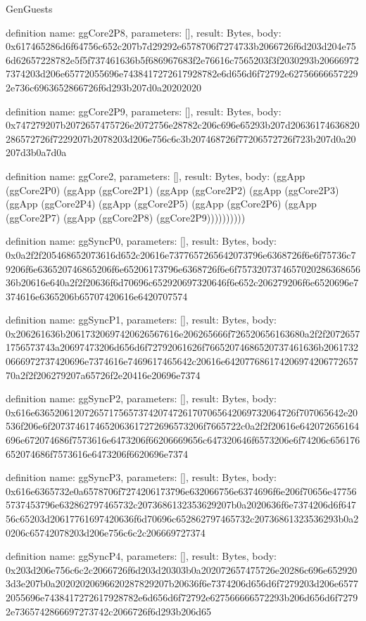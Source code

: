 \begin{lexlean}{GenGuests}
\begin{semanticmodule}
definition{
  name: ggCore2P8,
  parameters: [],
  result: Bytes,
  body: 0x617465286d6f64756c652c207b7d29292e6578706f7274733b2066726f6d203d204e756d62657228782e5f5f737461636b5f686967683f2e76616c7565203f3f2030293b206669727374203d206e65772055696e7438417272617928782e6d656d6f72792e627566666572292e736c6963652866726f6d293b207d0a20202020
}

definition{
  name: ggCore2P9,
  parameters: [],
  result: Bytes,
  body: 0x747279207b2072657475726e2072756e28782c206c696e65293b207d20636174636820286572726f7229207b2078203d206e756c6c3b207468726f77206572726f723b207d0a20207d3b0a7d0a
}

definition{
  name: ggCore2,
  parameters: [],
  result: Bytes,
  body: (ggApp (ggCore2P0) (ggApp (ggCore2P1) (ggApp (ggCore2P2) (ggApp (ggCore2P3) (ggApp (ggCore2P4) (ggApp (ggCore2P5) (ggApp (ggCore2P6) (ggApp (ggCore2P7) (ggApp (ggCore2P8) (ggCore2P9))))))))))
}

definition{
  name: ggSyncP0,
  parameters: [],
  result: Bytes,
  body: 0x0a2f2f205468652073616d652c20616e7377657265642073796e6368726f6e6f75736c79206f6e636520746865206f6e65206173796e6368726f6e6f757320737465702028636865636b20616e640a2f2f20636f6d70696c652920697320646f6e652c206279206f6e6520696e7374616e6365206b65707420616e6420707574
}

definition{
  name: ggSyncP1,
  parameters: [],
  result: Bytes,
  body: 0x206261636b20617320697420626567616e206265666f726520656163680a2f2f20726571756573743a20697473206d656d6f72792061626f76652074686520737461636b20617320666972737420696e7374616e7469617465642c20616e64207768617420697420677265770a2f2f206279207a65726f2e20416e20696e7374
}

definition{
  name: ggSyncP2,
  parameters: [],
  result: Bytes,
  body: 0x616e63652061207265717565737420747261707065642069732064726f707065642e20536f206e6f2073746174652063617272696573206f7665722c0a2f2f20616e642072656164696e672074686f7573616e6473206f66206669656c647320646f6573206e6f74206c656176652074686f7573616e6473206f6620696e7374
}

definition{
  name: ggSyncP3,
  parameters: [],
  result: Bytes,
  body: 0x616e6365732e0a6578706f7274206173796e632066756e6374696f6e206f70656e477565737453796e632862797465732c2073686132353629207b0a2020636f6e7374206d6f64756c65203d20617761697420636f6d70696c652862797465732c20736861323536293b0a20206c65742078203d206e756c6c2c206669727374
}

definition{
  name: ggSyncP4,
  parameters: [],
  result: Bytes,
  body: 0x203d206e756c6c2c2066726f6d203d20303b0a202072657475726e20286c696e6529203d3e207b0a20202020696620287829207b20636f6e7374206d656d6f7279203d206e65772055696e7438417272617928782e6d656d6f72792e627566666572293b206d656d6f72792e7365742866697273742c2066726f6d293b206d65
}


\end{semanticmodule}
\end{lexlean}
